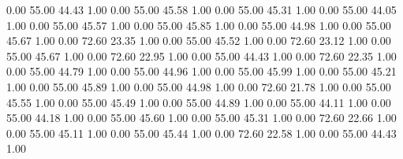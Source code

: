    0.00   55.00   44.43   1.00
   0.00   55.00   45.58   1.00
   0.00   55.00   45.31   1.00
   0.00   55.00   44.05   1.00
   0.00   55.00   45.57   1.00
   0.00   55.00   45.85   1.00
   0.00   55.00   44.98   1.00
   0.00   55.00   45.67   1.00
   0.00   72.60   23.35   1.00
   0.00   55.00   45.52   1.00
   0.00   72.60   23.12   1.00
   0.00   55.00   45.67   1.00
   0.00   72.60   22.95   1.00
   0.00   55.00   44.43   1.00
   0.00   72.60   22.35   1.00
   0.00   55.00   44.79   1.00
   0.00   55.00   44.96   1.00
   0.00   55.00   45.99   1.00
   0.00   55.00   45.21   1.00
   0.00   55.00   45.89   1.00
   0.00   55.00   44.98   1.00
   0.00   72.60   21.78   1.00
   0.00   55.00   45.55   1.00
   0.00   55.00   45.49   1.00
   0.00   55.00   44.89   1.00
   0.00   55.00   44.11   1.00
   0.00   55.00   44.18   1.00
   0.00   55.00   45.60   1.00
   0.00   55.00   45.31   1.00
   0.00   72.60   22.66   1.00
   0.00   55.00   45.11   1.00
   0.00   55.00   45.44   1.00
   0.00   72.60   22.58   1.00
   0.00   55.00   44.43   1.00